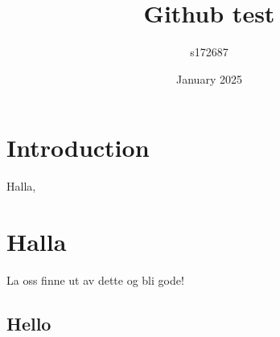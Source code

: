 \documentclass{article}
\title{Github test}
\author{s172687 }
\date{January 2025}
\begin{document}
\maketitle

\section{Introduction}
Halla, 
\section{Halla}
La oss finne ut av dette og bli gode!


\subsection{Hello}
\end{document}
